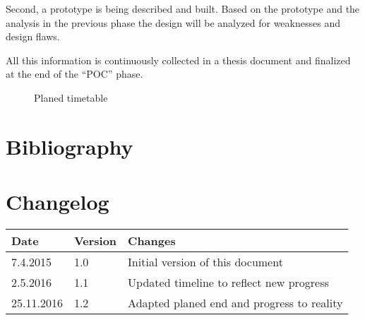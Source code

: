 \documentclass[twocolumn,a4paper,10pt,english]{scrartcl}
\begin{document}
Second, a prototype is being described and built. Based on the prototype and the analysis in the previous phase the design will be analyzed for weaknesses and design flaws.\par
All this information is continuously collected in a thesis document and finalized at the end of the ``POC'' phase.\par
\begin{figure}[H]%
\caption{Planed timetable}%
\label{Gant chart}%
\end{figure}

\section{Bibliography}
\printbibliography[title={},heading=none]

\section{Changelog}
\begin{tabular}{|l|l|l|}\hline
	Date       & Version & Changes\\\hline
	7.4.2015   & 1.0     & Initial version of this document\\
	2.5.2016   & 1.1     & Updated timeline to reflect new progress\\
	25.11.2016 & 1.2     & Adapted planed end and progress to reality\\
	\hline
\end{tabular}
\end{document}
